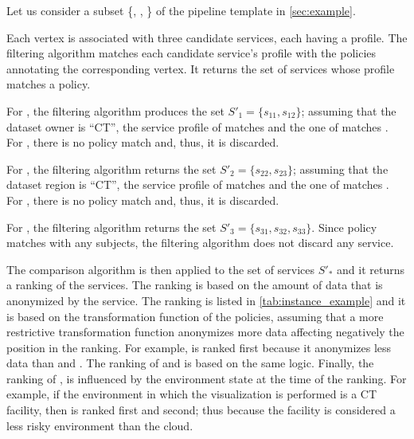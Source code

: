 \begin{example}\label{ex:instance}

  Let us consider a subset \{, , \} of the pipeline template \tChartFunction in \cref{sec:example}.

  Each vertex is associated with three candidate services, each having a profile. The filtering algorithm matches each candidate service's profile with the policies annotating the corresponding vertex. It returns the set of services whose profile matches a policy.
  \begin{enumerate*}[label=\textit{\roman*})]
    \item For , the filtering algorithm produces the set $S'_1=\{s_{11},s_{12}\}$; assuming that the dataset owner is ``CT'', the service profile of  matches  and the one of  matches .
          For , there is no policy match and, thus, it is discarded.
    \item For , the filtering algorithm returns the set $S'_2=\{s_{22},s_{23}\}$; assuming that the dataset region is ``CT'', the service profile of  matches  and the one of  matches .
          For , there is no policy match and, thus, it is discarded.
    \item For , the filtering algorithm returns the set $S'_3=\{s_{31},s_{32},s_{33}\}$. Since policy  matches with any subjects, the filtering algorithm does not discard any service.
  \end{enumerate*}

  The comparison algorithm is then applied to the set of services $S'_*$ and it returns a ranking of the services.
  The ranking is based on the amount of data that is anonymized by the service.
  The ranking is listed in \cref{tab:instance_example} and it is based on the transformation function of the policies,
  assuming that a more restrictive transformation function anonymizes more data affecting negatively the position in the ranking.
  For example,  is ranked first because it anonymizes less data than  and .
  The ranking of  and  is based on the same logic.
  Finally, the ranking of ,  is influenced by the environment state at the time of the ranking.
  For example, if the environment in which the visualization is performed is a CT facility, then  is ranked first and  second;
  thus because the facility is considered a less risky environment than the cloud.




\end{example}
